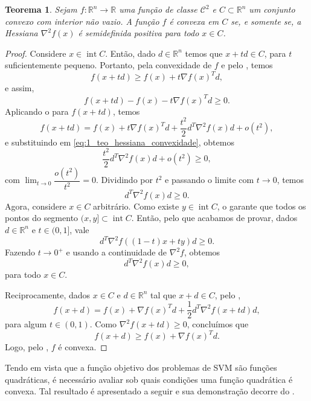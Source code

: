 \documentclass[12pt,a4paper]{scrartcl}
\DeclareMathOperator{\interior}{int}
\def\RR{\mathds{R}}
\newtheorem{teo}{Teorema}
\theoremstyle{definition}%
\begin{document}
\begin{teo} \label{teo:hessiana_convexidade}
Sejam $f:\RR^{n} \rightarrow \RR $ uma função de classe $\mathcal{C}^{2}$ e $C \subset \RR^{n}$ um conjunto convexo com interior não vazio. A função $f$ é convexa em $C$ se, e somente se, a Hessiana $\nabla^{2} f(x)$ é semidefinida positiva para todo $x \in C$.
\end{teo}
\begin{proof}
Considere $x \in \interior C$. Então, dado $d \in \RR^{n}$ temos que $x+td \in C$, para $t$ suficientemente pequeno. Portanto, pela convexidade de $f$ e pelo , temos
\[
f(x+td) \geq f(x) + t\nabla f(x)^{T} d ,
\]
e assim, 
\[ \label{eq:1_teo_hessiana_convexidade}
f(x+td) -f(x) - t\nabla f(x)^{T} d \geq 0 . 
\]
Aplicando o  para $f(x+td)$, temos
\[
f(x+td) = f(x) + t\nabla f(x)^{T}d + \dfrac{t^{2}}{2}d^{T} \nabla^{2} f(x)d + o(t^{2}) ,
\]
e substituindo em \eqref{eq:1_teo_hessiana_convexidade}, obtemos
\[
\dfrac{t^{2}}{2}d^{T} \nabla^{2} f(x)d + o(t^{2}) \geq 0 ,
\]
com $\displaystyle\lim_{t \rightarrow 0} \dfrac{o(t^{2})}{t^{2}} = 0$. 
Dividindo por $t^{2}$ e passando o limite com $t \rightarrow 0$, temos
\[
d^{T} \nabla^{2} f(x)d \geq 0 .
\]
Agora, considere $x \in C$ arbitrário. Como existe $y \in \interior C$, o  garante que todos os pontos do segmento $(x,y] \subset \interior C$. Então, pelo que acabamos de provar, dados $d \in \RR^{n}$ e $t\in (0,1]$, vale
\[
d^{T} \nabla^{2} f((1-t)x+ty)d \geq 0 .
\]
Fazendo $t \rightarrow 0^{+}$ e usando a continuidade de $\nabla^{2} f$, obtemos
\[
d^{T} \nabla^{2} f(x)d \geq 0,
\]
para todo $x \in C$.

Reciprocamente, dados $x \in C$ e $d \in \RR^{n}$ tal que $x+d \in C$, pelo ,
\[
f(x+d) = f(x) + \nabla f(x)^{T}d + \dfrac{1}{2}d^{T} \nabla^{2} f(x+td)d,
\]
para algum $t \in (0,1)$. Como $\nabla ^{2}f(x+td) \geq 0$, concluímos que 
\[
f(x+d) \geq f(x) + \nabla f(x)^{T}d .
\]
Logo, pelo , $f$ é convexa.
\end{proof}

Tendo em vista que a função objetivo dos problemas de SVM são funções quadráticas, é necessário avaliar sob quais condições uma função quadrática é convexa. Tal resultado é apresentado a seguir e sua demonstração decorre do .
\end{document}
